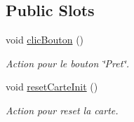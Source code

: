 \subsection*{Public Slots}
\begin{DoxyCompactItemize}
\item 
void \hyperlink{classAffichageInitJ1_a0ff516a3f3cc659cfb47e489076e99ac}{clic\+Bouton} ()
\begin{DoxyCompactList}\small\item\em Action pour le bouton \char`\"{}\+Pret\char`\"{}. \end{DoxyCompactList}\item 
void \hyperlink{classAffichageInitJ1_a785223ce5e31cc613821618c569210ca}{reset\+Carte\+Init} ()
\begin{DoxyCompactList}\small\item\em Action pour reset la carte. \end{DoxyCompactList}\end{DoxyCompactItemize}
